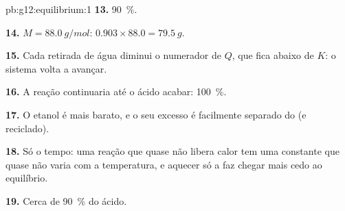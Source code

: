 \begin{solution}{pb:g12:equilibrium:1}
\textbf{13.} \qty{90}{\percent}.

\textbf{14.} $M = \qty{88.0}{g/mol}$: $0.903 \times 88.0 = \qty{79.5}{g}$.

\textbf{15.} Cada retirada de água diminui o numerador de $Q$, que fica
abaixo de $K$: o sistema volta a avançar.

\textbf{16.} A reação continuaria até o ácido acabar:
\qty{100}{\percent}.

\textbf{17.} O etanol é mais barato, e o seu excesso é facilmente
separado do  (e reciclado).

\textbf{18.} Só o tempo: uma reação que quase não libera calor tem uma
constante que quase não varia com a temperatura, e aquecer só a faz
chegar mais cedo ao equilíbrio.

\textbf{19.} Cerca de \qty{90}{\percent} do ácido.
\end{solution}
